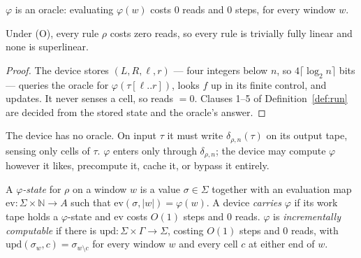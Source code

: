 \begin{definition}\label{def:oracle}
$\varphi$ is an oracle: evaluating $\varphi(w)$ costs $0$ reads and $0$ steps, for every window $w$.
\end{definition}

\begin{proposition}\label{prop:oracle}
Under (O), every rule $\rho$ costs zero reads, so every rule is trivially fully linear and none is
superlinear.
\end{proposition}

\begin{proof}
The device stores $(L,R,\ell,r)$ --- four integers below $n$, so $4\lceil\log_{2}n\rceil$ bits ---
queries the oracle for $\varphi(\tau[\ell..r])$, looks $f$ up in its finite control, and updates. It
never senses a cell, so reads $=0$. Clauses 1--5 of Definition~\ref{def:run} are decided from the
stored state and the oracle's answer.
\end{proof}

\begin{definition}\label{def:computed}
The device has no oracle. On input $\tau$ it must write $\delta_{\rho,n}(\tau)$ on its output tape,
sensing only cells of $\tau$. $\varphi$ enters only through $\delta_{\rho,n}$; the device may compute
$\varphi$ however it likes, precompute it, cache it, or bypass it entirely.
\end{definition}

\begin{definition}\label{def:phistate}
A \emph{$\varphi$-state} for $\rho$ on a window $w$ is a value $\sigma\in\Sigma$ together with an
evaluation map $\mathrm{ev}:\Sigma\times\mathbb N\to A$ such that $\mathrm{ev}(\sigma,|w|)=\varphi(w)$.
A device \emph{carries} $\varphi$ if its work tape holds a $\varphi$-state and $\mathrm{ev}$ costs
$O(1)$ steps and $0$ reads. $\varphi$ is \emph{incrementally computable} if there is
$\mathrm{upd}:\Sigma\times\Gamma\to\Sigma$, costing $O(1)$ steps and $0$ reads, with
$\mathrm{upd}(\sigma_{w},c)=\sigma_{w\setminus c}$ for every window $w$ and every cell $c$ at either
end of $w$.
\end{definition}

